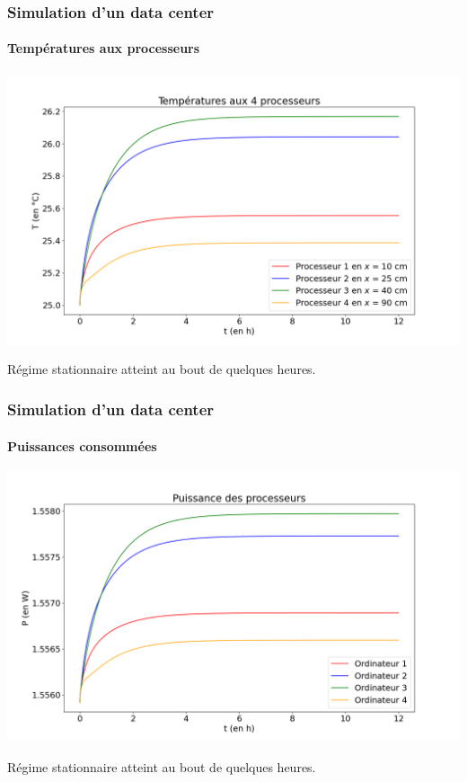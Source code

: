 \documentclass[a4paper,11pt]{beamer}
\begin{document}
\begin{frame}
    \frametitle{Simulation d'un data center}
    \framesubtitle{Températures aux processeurs}

    \includegraphics[width=\textwidth]{temperatures_processeurs.png}

    Régime stationnaire atteint au bout de quelques heures.
\end{frame}

\begin{frame}
    \frametitle{Simulation d'un data center}
    \framesubtitle{Puissances consommées}

    \includegraphics[width=\textwidth]{puissances.png}

    Régime stationnaire atteint au bout de quelques heures.
\end{frame}
\end{document}
